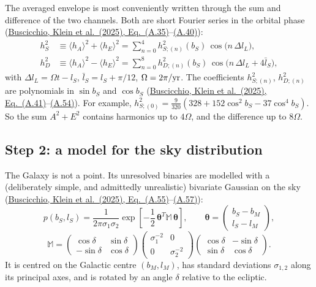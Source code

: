 \documentclass[11pt,a4paper]{article}
\newcommand{\urlPtwo}{https://arxiv.org/pdf/2410.08263}
\newcommand{\PtwoEq}[1]{\href{\urlPtwo}{Buscicchio, Klein et al.~(2025), Eq.~(#1)}}
\begin{document}
The averaged envelope is most conveniently written through the sum and difference
of the two channels. Both are short Fourier series in the orbital phase
(\PtwoEq{A.35}--\href{\urlPtwo}{(A.40)}):
\begin{align}
  h_S^2 &\equiv \langle h_A\rangle^2 + \langle h_E\rangle^2
         = \sum_{n=0}^{4} h^2_{S;(n)}(b_S)\, \cos\big(n\,\Delta l_L\big), \\
  h_D^2 &\equiv \langle h_A\rangle^2 - \langle h_E\rangle^2
         = \sum_{n=0}^{8} h^2_{D;(n)}(b_S)\, \cos\big(n\,\Delta l_L + 4\bar l_S\big),
\end{align}
with $\Delta l_L = \Omega t - l_S$, $\bar l_S = l_S + \pi/12$, $\Omega = 2\pi/{\rm yr}$.
The coefficients $h^2_{S;(n)}$, $h^2_{D;(n)}$ are polynomials in $\sin b_S$ and
$\cos b_S$ (\PtwoEq{A.41}--\href{\urlPtwo}{(A.54)}). For example,
$h^2_{S;(0)} = \tfrac{9}{320}\left(328 + 152\cos^2 b_S - 37\cos^4 b_S\right)$.
So the sum $A^2+E^2$ contains harmonics up to $4\Omega$, and the difference up to
$8\Omega$.

\subsection{Step 2: a model for the sky distribution}

The Galaxy is not a point. Its unresolved binaries are modelled with a (deliberately
simple, and admittedly unrealistic) bivariate Gaussian on the sky
(\PtwoEq{A.55}--\href{\urlPtwo}{(A.57)}):
\begin{equation}
  p(b_S,l_S) = \frac{1}{2\pi\sigma_1\sigma_2}\exp\!\left[-\frac12\,\boldsymbol\theta^T\mathbb{M}\,\boldsymbol\theta\right],
  \qquad
  \boldsymbol\theta = \begin{pmatrix} b_S-b_M\\ l_S-l_M\end{pmatrix},
\end{equation}
\begin{equation}
  \mathbb{M} =
  \begin{pmatrix}\cos\delta & \sin\delta\\ -\sin\delta & \cos\delta\end{pmatrix}
  \begin{pmatrix}\sigma_1^{-2} & 0\\ 0 & \sigma_2^{-2}\end{pmatrix}
  \begin{pmatrix}\cos\delta & -\sin\delta\\ \sin\delta & \cos\delta\end{pmatrix}.
\end{equation}
It is centred on the Galactic centre $(b_M,l_M)$, has standard deviations
$\sigma_{1,2}$ along its principal axes, and is rotated by an angle $\delta$
relative to the ecliptic.
\end{document}
